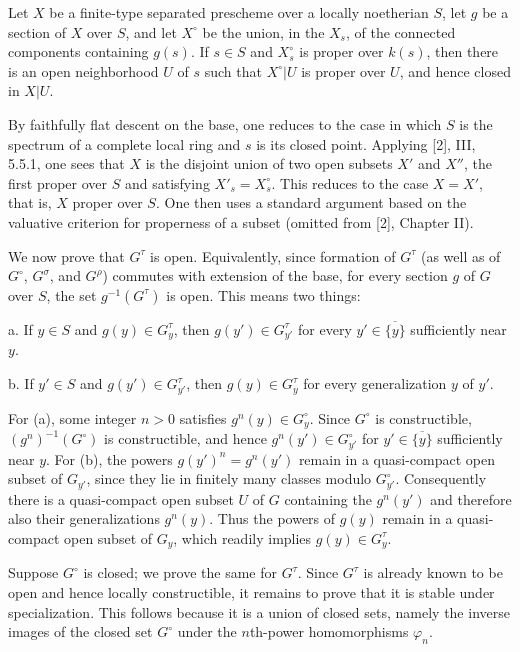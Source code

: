  Let $X$ be a finite-type separated prescheme over a locally
noetherian $S$, let $g$ be a section of $X$ over $S$, and let $X^\circ$ be the
union, in the $X_s$, of the connected components containing $g(s)$. If
$s\in S$ and $X_s^\circ$ is proper over $k(s)$, then there is an open
neighborhood $U$ of $s$ such that $X^\circ|U$ is proper over $U$, and hence
closed in $X|U$.

By faithfully flat descent on the base, one reduces to the case in which $S$
is the spectrum of a complete local ring and $s$ is its closed point. Applying
[2], III, 5.5.1, one sees that $X$ is the disjoint union of two open subsets
$X'$ and $X''$, the first proper over $S$ and satisfying
$X'_s=X_s^\circ$. This reduces to the case $X=X'$, that is, $X$ proper over
$S$. One then uses a standard argument based on the valuative criterion for
properness of a subset (omitted from [2], Chapter II).

We now prove that $G^\tau$ is open. Equivalently, since formation of $G^\tau$
(as well as of $G^\circ$, $G^\sigma$, and $G^\rho$) commutes with extension of
the base, for every section $g$ of $G$ over $S$, the set $g^{-1}(G^\tau)$ is
open. This means two things:

\medskip
\noindent a. If $y\in S$ and $g(y)\in G_y^\tau$, then
$g(y')\in G_{y'}^\tau$ for every $y'\in\overline{\{y\}}$ sufficiently near
$y$.

\medskip
\noindent b. If $y'\in S$ and $g(y')\in G_{y'}^\tau$, then
$g(y)\in G_y^\tau$ for every generalization $y$ of $y'$.

For (a), some integer $n>0$ satisfies $g^n(y)\in G_y^\circ$. Since $G^\circ$
is constructible, $(g^n)^{-1}(G^\circ)$ is constructible, and hence
$g^n(y')\in G_{y'}^\circ$ for $y'\in\overline{\{y\}}$ sufficiently near $y$.
For (b), the powers $g(y')^n=g^n(y')$ remain in a quasi-compact open subset of
$G_{y'}$, since they lie in finitely many classes modulo $G_{y'}^\circ$.
Consequently there is a quasi-compact open subset $U$ of $G$ containing the
$g^n(y')$ and therefore also their generalizations $g^n(y)$. Thus the powers
of $g(y)$ remain in a quasi-compact open subset of $G_y$, which readily implies
$g(y)\in G_y^\tau$.

Suppose $G^\circ$ is closed; we prove the same for $G^\tau$. Since $G^\tau$ is
already known to be open and hence locally constructible, it remains to prove
that it is stable under specialization. This follows because it is a union of
closed sets, namely the inverse images of the closed set $G^\circ$ under the
$n$th-power homomorphisms $\varphi_n$.


